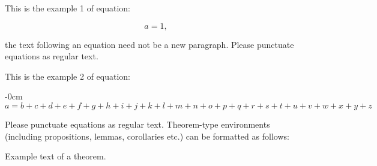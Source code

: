 \documentclass[journal,article,submit,pdftex,moreauthors]{Definitions/mdpi}
\begin{document}
This is the example 1 of equation:
\begin{linenomath}
\begin{equation}
a = 1,
\end{equation}
\end{linenomath}
the text following an equation need not be a new paragraph. Please punctuate equations as regular text.

This is the example 2 of equation:
\begin{adjustwidth}{-\extralength}{0cm}
\begin{equation}
a = b + c + d + e + f + g + h + i + j + k + l + m + n + o + p + q + r + s + t + u + v + w + x + y + z
\end{equation}
\end{adjustwidth}



Please punctuate equations as regular text. Theorem-type environments (including propositions, lemmas, corollaries etc.) can be formatted as follows:
\begin{Theorem}
Example text of a theorem.
\end{Theorem}
\end{document}
